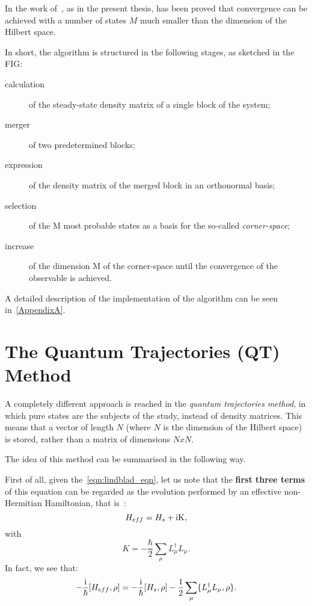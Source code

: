 In the work of~\cite{PhysRevLett.115.080604}, as in the present thesis, has been proved that convergence can be achieved with a number of states $M$ much smaller than the dimension of the Hilbert space.


\bigskip
In short, the algorithm is structured in the following stages, as sketched in the FIG:
\begin{description}
    \item[calculation] of the steady-state density matrix of a single block of the system;
    \item[merger] of two predetermined blocks;
    \item[expression] of the density matrix of the merged block in an orthonormal basis;
    \item[selection] of the M most probable states as a basis for the so-called \emph{corner-space};
    \item[increase] of the dimension M of the corner-space until the convergence of the observable is achieved.
\end{description}

A detailed description of the implementation of the algorithm can be seen in~\ref{AppendixA}.


\section{The Quantum Trajectories (QT) Method}
A completely different approach is reached in the \emph{quantum trajectories method}, in which pure states are the subjects of the study, instead of density matrices. This means that a vector of length $N$ (where $N$ is the dimension of the Hilbert space) is stored, rather than a matrix of dimensions $NxN$.

The idea of this method can be summarised in the following way.

First of all, given the~\ref{eqn:lindblad_eqn}, let us note that the \textbf{first three terms} of this equation can be regarded as the evolution performed by an effective non-Hermitian Hamiltonian, that is~\cite{PhysRevA.69.062317}:
\[
H_{eff} = H_s + \rm{i}K,
\]
with
\[
K = -\frac{\hbar}{2}\sum_\mu L_{\mu}^{\dagger}L_{\mu}.
\]
In fact, we see that:
\[
    -\frac{\rm{i}}{\hbar}[H_{eff}, \rho] = -\frac{\rm{i}}{\hbar}[H_s, \rho] - \frac{1}{2}\sum_\mu \{L_{\mu}^{\dagger}L_{\mu}, \rho\}.
\]

